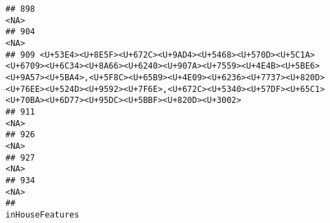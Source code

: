 \documentclass[
]{article}
\begin{document}
\begin{verbatim}
## 898                                                                                                                                                                                                                                                                                                       <NA>
## 904                                                                                                                                                                                                                                                                                                       <NA>
## 909 <U+53E4><U+8E5F><U+672C><U+9AD4><U+5468><U+570D><U+5C1A><U+6709><U+6C34><U+8A66><U+6240><U+907A><U+7559><U+4E4B><U+5BE6><U+9A57><U+5BA4>,<U+5F8C><U+65B9><U+4E09><U+6236><U+7737><U+820D><U+76EE><U+524D><U+9592><U+7F6E>,<U+672C><U+5340><U+57DF><U+65C1><U+70BA><U+6D77><U+95DC><U+5BBF><U+820D><U+3002>
## 911                                                                                                                                                                                                                                                                                                       <NA>
## 926                                                                                                                                                                                                                                                                                                       <NA>
## 927                                                                                                                                                                                                                                                                                                       <NA>
## 934                                                                                                                                                                                                                                                                                                       <NA>
##                                                                                                                                                                                                                                                                                                                                                                                                                                                                           inHouseFeatures

\end{verbatim}
\end{document}
